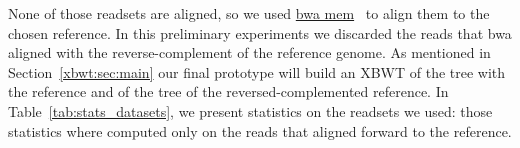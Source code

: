 None of those readsets are aligned, so we used \href{https://github.com/lh3/bwa}{{bwa mem}}~\cite{li2009fast} to align them to the chosen reference. In this preliminary experiments we discarded the reads that bwa aligned with the reverse-complement of the reference genome. As mentioned in Section~\ref{xbwt:sec:main} our final prototype will build an XBWT of the tree with the reference and of the tree of the reversed-complemented reference. In Table~\ref{tab:stats_datasets}, we present statistics on the readsets we used: those statistics where computed only on the reads that aligned forward to the reference.


\begin{table}[t]
\end{table}

